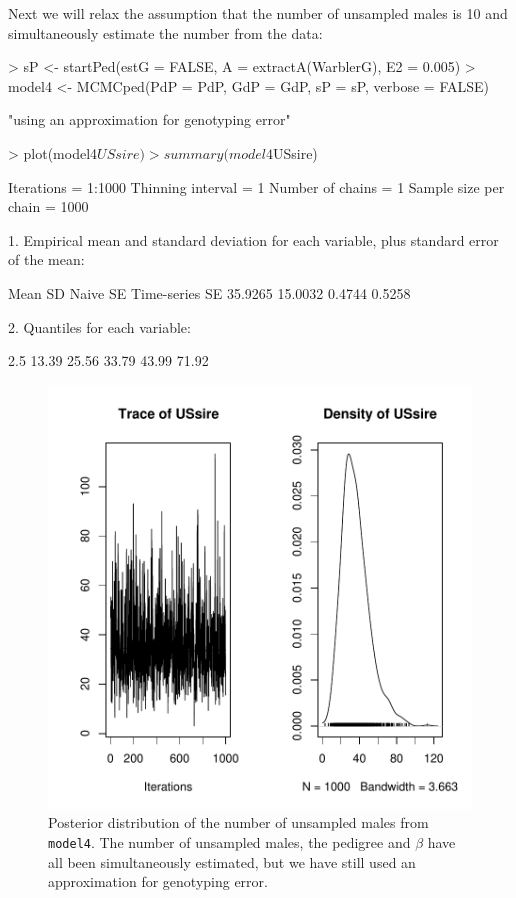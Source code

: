 \documentclass{article}
\begin{document}
Next we will relax the assumption that the number of unsampled males is 10 and simultaneously estimate the number from the data:

\begin{Schunk}
\begin{Sinput}
> sP <- startPed(estG = FALSE, A = extractA(WarblerG), E2 = 0.005)
> model4 <- MCMCped(PdP = PdP, GdP = GdP, sP = sP, verbose = FALSE)
\end{Sinput}
\begin{Soutput}
[1] "using an approximation for genotyping error"
\end{Soutput}
\begin{Sinput}
> plot(model4$USsire)
> summary(model4$USsire)
\end{Sinput}
\begin{Soutput}
Iterations = 1:1000
Thinning interval = 1 
Number of chains = 1 
Sample size per chain = 1000 

1. Empirical mean and standard deviation for each variable,
   plus standard error of the mean:

          Mean             SD       Naive SE Time-series SE 
       35.9265        15.0032         0.4744         0.5258 

2. Quantiles for each variable:

 2.5%
13.39 25.56 33.79 43.99 71.92 
\end{Soutput}
\end{Schunk}


\begin{figure}[!h]
\begin{center}
\includegraphics{Tutorial-030}
\end{center}
\caption{Posterior distribution of the number of unsampled males from \texttt{model4}. The number of unsampled males, the pedigree and $\beta$ have all been simultaneously estimated, but we have still used an approximation for genotyping error.}
\label{model4US-fig}
\end{figure}
\end{document}
